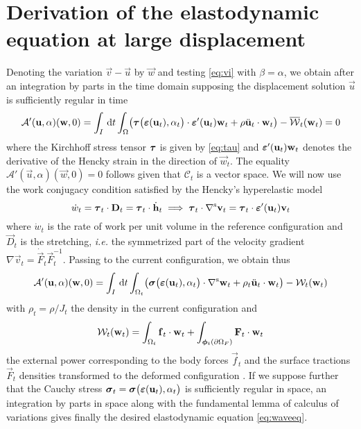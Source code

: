 \section{Derivation of the elastodynamic equation at large displacement} \label{sec:elastodyna}
Denoting the variation $\vec{v}-\vec{u}$ by $\vec{w}$ and testing \eqref{eq:vi} with $\beta=\alpha$, we obtain after an integration by parts in the time domain supposing the displacement solution $\vec{u}$ is sufficiently regular in time
\[
\mathcal{A}'(\vec{u},\alpha)(\vec{w},0)=\int_I\D{t}\int_\Omega\bigl(\vtau\bigl(\eps(\vec{u}_t),\alpha_t\bigr)\cdot\eps'(\vec{u}_t)\vec{w}_t+\rho\ddot{\vec{u}}_t\cdot\vec{w}_t\bigr)-\overline{\mathcal{W}}_t(\vec{w}_t)=0
\]
where the Kirchhoff stress tensor $\vtau$ is given by \eqref{eq:tau} and $\eps'(\vec{u}_t)\vec{w}_t$ denotes the derivative of the Hencky strain in the direction of $\vec{w}_t$. The equality $\mathcal{A}'(\vec{u},\alpha)(\vec{w},0)=0$ follows given that $\mathcal{C}_t$ is a vector space. We will now use the work conjugacy condition satisfied by the Hencky's hyperelastic model \cite{XiaoChen:2002}
\begin{equation} \label{eq:workconjugacy}
\dot{w}_t=\vtau_t\cdot\vec{D}_t=\vtau_t\cdot\dot{\vec{h}}_t\implies\vtau_t\cdot\symgrad\vec{v}_t=\vtau_t\cdot\eps'(\vec{u}_t)\vec{v}_t
\end{equation}
where $\dot{w}_t$ is the rate of work per unit volume in the reference configuration and $\vec{D}_t$ is the stretching, \emph{i.e.} the symmetrized part of the velocity gradient $\nabla\vec{v}_t=\dot{\vec{F}}_t\vec{F}_t^{-1}$. Passing to the current configuration, we obtain thus
\[
\mathcal{A}'(\vec{u},\alpha)(\vec{w},0)=\int_I\D{t}\int_{\Omega_t}\bigl(\sig\bigl(\eps(\vec{u}_t),\alpha_t\bigr)\cdot\symgrad\vec{w}_t+\rho_t\ddot{\vec{u}}_t\cdot\vec{w}_t\bigr)-\mathcal{W}_t(\vec{w}_t)
\]
with $\rho_t=\rho/J_t$ the density in the current configuration and
\[
\mathcal{W}_t(\vec{w}_t)=\int_{\Omega_t}\vec{f}_t\cdot\vec{w}_t+\int_{\vphi_t(\partial\Omega_F)}\vec{F}_t\cdot\vec{w}_t
\]
the external power corresponding to the body forces $\vec{f}_t$ and the surface tractions $\vec{F}_t$ densities transformed to the deformed configuration \cite{Ciarlet:1993aa}. If we suppose further that the Cauchy stress $\sig_t=\sig\bigl(\eps(\vec{u}_t),\alpha_t\bigr)$ is sufficiently regular in space, an integration by parts in space along with the fundamental lemma of calculus of variations gives finally the desired elastodynamic equation \eqref{eq:waveeq}.